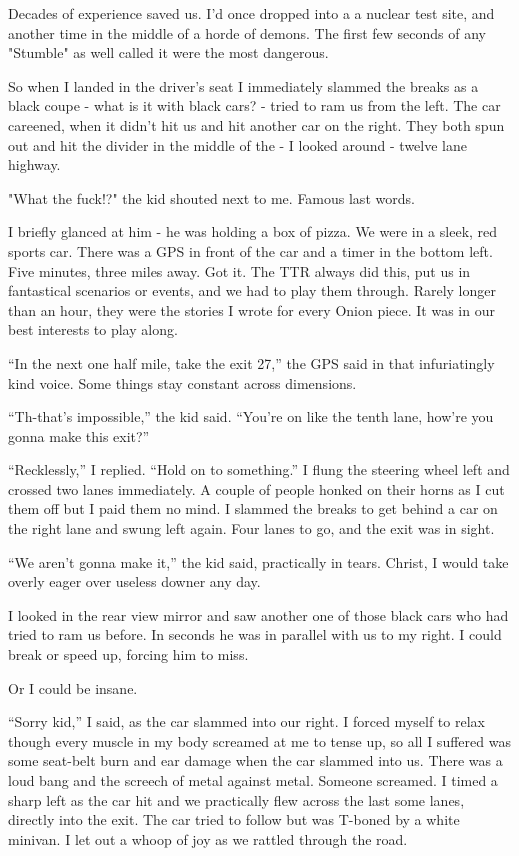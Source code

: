 Decades of experience saved us. I'd once dropped into a a nuclear test site, and another time in the middle of a horde of demons. The first few seconds of any "Stumble" as well called it were the most dangerous.

So when I landed in the driver's seat I immediately slammed the breaks as a black coupe - what is it with black cars? - tried to ram us from the left. The car careened, when it didn't hit us and hit another car on the right. They both spun out and hit the divider in the middle of the - I looked around - twelve lane highway.

"What the fuck!?" the kid shouted next to me. Famous last words.

I briefly glanced at him - he was holding a box of pizza. We were in a sleek, red sports car. There was a GPS in front of the car and a timer in the bottom left. Five minutes, three miles away. Got it. The TTR always did this, put us in fantastical scenarios or events, and we had to play them through. Rarely longer than an hour, they were the stories I wrote for every Onion piece. It was in our best interests to play along.

“In the next one half mile, take the exit 27,” the GPS said in that infuriatingly kind voice. Some things stay constant across dimensions.

“Th-that’s impossible,” the kid said. “You’re on like the tenth lane, how’re you gonna make this exit?”

“Recklessly,” I replied. “Hold on to something.” I flung the steering wheel left and crossed two lanes immediately. A couple of people honked on their horns as I cut them off but I paid them no mind. I slammed the breaks to get behind a car on the right lane and swung left again. Four lanes to go, and the exit was in sight.

“We aren’t gonna make it,” the kid said, practically in tears. Christ, I would take overly eager over useless downer any day.

I looked in the rear view mirror and saw another one of those black cars who had tried to ram us before. In seconds he was in parallel with us to my right. I could break or speed up, forcing him to miss.

Or I could be insane.

“Sorry kid,” I said, as the car slammed into our right. I forced myself to relax though every muscle in my body screamed at me to tense up, so all I suffered was some seat-belt burn and ear damage when the car slammed into us. There was a loud bang and the screech of metal against metal. Someone screamed. I timed a sharp left as the car hit and we practically flew across the last some lanes, directly into the exit. The car tried to follow but was T-boned by a white minivan. I let out a whoop of joy as we rattled through the road.


